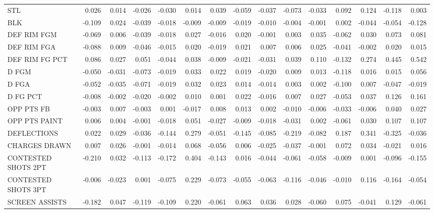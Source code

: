 \begin{tabular}{lrrrrrrrrrrrrrr}
STL & 0.026 & 0.014 & -0.026 & -0.030 & 0.014 & 0.039 & -0.059 & -0.037 & -0.073 & -0.033 & 0.092 & 0.124 & -0.118 & 0.003 \\
BLK & -0.109 & 0.024 & -0.039 & -0.018 & -0.009 & -0.009 & -0.019 & -0.010 & -0.004 & -0.001 & 0.002 & -0.044 & -0.054 & -0.128 \\
DEF RIM FGM & -0.069 & 0.006 & -0.039 & -0.018 & 0.027 & -0.016 & 0.020 & -0.001 & 0.003 & 0.035 & -0.062 & 0.030 & 0.073 & 0.081 \\
DEF RIM FGA & -0.088 & 0.009 & -0.046 & -0.015 & 0.020 & -0.019 & 0.021 & 0.007 & 0.006 & 0.025 & -0.041 & -0.002 & 0.020 & 0.015 \\
DEF RIM FG PCT & 0.086 & 0.027 & 0.051 & -0.044 & 0.038 & -0.009 & -0.021 & -0.031 & 0.039 & 0.110 & -0.132 & 0.274 & 0.445 & 0.542 \\
D FGM & -0.050 & -0.031 & -0.073 & -0.019 & 0.033 & 0.022 & 0.019 & -0.020 & 0.009 & 0.013 & -0.118 & 0.016 & 0.015 & 0.056 \\
D FGA & -0.052 & -0.035 & -0.071 & -0.019 & 0.032 & 0.023 & 0.014 & -0.014 & 0.003 & 0.002 & -0.100 & 0.007 & -0.047 & -0.019 \\
D FG PCT & -0.008 & -0.002 & -0.020 & -0.002 & 0.010 & 0.001 & 0.022 & -0.016 & 0.007 & 0.027 & -0.053 & 0.037 & 0.126 & 0.161 \\
OPP PTS FB & -0.003 & 0.007 & -0.003 & 0.001 & -0.017 & 0.008 & 0.013 & 0.002 & -0.010 & -0.006 & -0.033 & -0.006 & 0.040 & 0.027 \\
OPP PTS PAINT & 0.006 & 0.004 & -0.001 & -0.018 & 0.051 & -0.027 & -0.009 & -0.018 & -0.031 & 0.002 & -0.061 & 0.030 & 0.107 & 0.107 \\
DEFLECTIONS & 0.022 & 0.029 & -0.036 & -0.144 & 0.279 & -0.051 & -0.145 & -0.085 & -0.219 & -0.082 & 0.187 & 0.341 & -0.325 & -0.036 \\
CHARGES DRAWN & 0.007 & 0.026 & -0.001 & -0.014 & 0.068 & -0.056 & 0.006 & -0.025 & -0.037 & -0.001 & 0.072 & 0.034 & -0.021 & 0.016 \\
CONTESTED SHOTS 2PT & -0.210 & 0.032 & -0.113 & -0.172 & 0.404 & -0.143 & 0.016 & -0.044 & -0.061 & -0.058 & -0.009 & 0.001 & -0.096 & -0.155 \\
CONTESTED SHOTS 3PT & -0.006 & -0.023 & 0.001 & -0.075 & 0.229 & -0.073 & -0.055 & -0.063 & -0.116 & -0.046 & -0.010 & 0.116 & -0.164 & -0.054 \\
SCREEN ASSISTS & -0.182 & 0.047 & -0.119 & -0.109 & 0.220 & -0.061 & 0.063 & 0.036 & 0.028 & -0.060 & 0.075 & -0.041 & 0.129 & -0.061 \\

\end{tabular}
